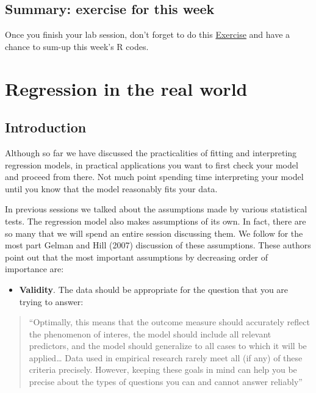 \documentclass[
]{book}
\providecommand{\tightlist}{%
  \setlength{\itemsep}{0pt}\setlength{\parskip}{0pt}}
\begin{document}
\section{Summary: exercise for this week}\label{summary-exercise-for-this-week-7}

Once you finish your lab session, don't forget to do this \href{https://eonk.shinyapps.io/MCD_ex}{Exercise} and have a chance to sum-up this week's R codes.

\chapter{Regression in the real world}\label{regression-in-the-real-world}

\section{Introduction}\label{introduction-3}

Although so far we have discussed the practicalities of fitting and interpreting regression models, in practical applications you want to first check your model and proceed from there. Not much point spending time interpreting your model until you know that the model reasonably fits your data.

In previous sessions we talked about the assumptions made by various statistical tests. The regression model also makes assumptions of its own. In fact, there are so many that we will spend an entire session discussing them. We follow for the most part Gelman and Hill (2007) discussion of these assumptions. These authors point out that the most important assumptions by decreasing order of importance are:

\begin{itemize}
\tightlist
\item
  \textbf{Validity}. The data should be appropriate for the question that you are trying to answer:
\end{itemize}

\begin{quote}
``Optimally, this means that the outcome measure should accurately reflect the phenomenon of interes, the model should include all relevant predictors, and the model should generalize to all cases to which it will be applied\ldots{} Data used in empirical research rarely meet all (if any) of these criteria precisely. However, keeping these goals in mind can help you be precise about the types of questions you can and cannot answer reliably''
\end{quote}
\end{document}

